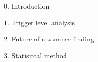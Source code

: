 
0. Introduction

1. Trigger level analysis

2. Future of resonance finding

3. Statisitcal method  


